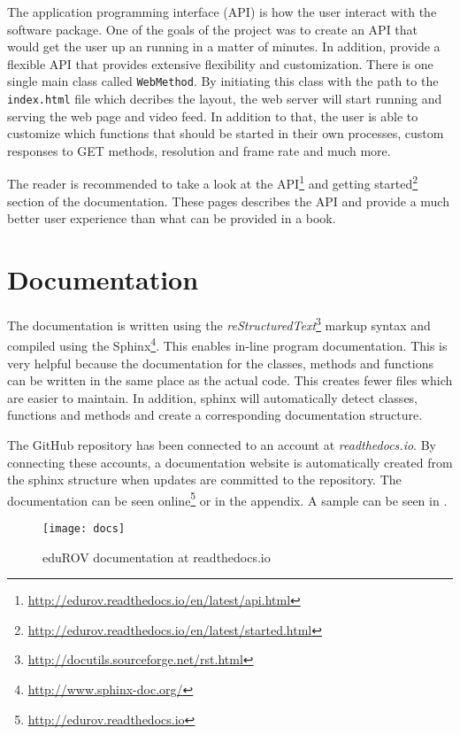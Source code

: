 The application programming interface (API) is how the user interact with the software package. One of the goals of the project was to create an API that would get the user up an running in a matter of minutes. In addition, provide a flexible API that provides extensive flexibility and customization. There is one single main class called \texttt{WebMethod}. By initiating this class with the path to the \texttt{index.html} file which decribes the layout, the web server will start running and serving the web page and video feed. In addition to that, the user is able to customize which functions that should be started in their own processes, custom responses to GET methods, resolution and frame rate and much more.

The reader is recommended to take a look at the API\footnote{\url{http://edurov.readthedocs.io/en/latest/api.html}} and getting started\footnote{\url{http://edurov.readthedocs.io/en/latest/started.html}} section of the documentation. These pages describes the API and provide a much better user experience than what can be provided in a book. 


\section{Documentation}


The documentation is written using the \emph{reStructuredText}\footnote{\url{http://docutils.sourceforge.net/rst.html}} markup syntax and compiled using the Sphinx\footnote{\url{http://www.sphinx-doc.org/}}. This enables in-line program documentation. This is very helpful because the documentation for the classes, methods and functions can be written in the same place as the actual code. This creates fewer files which are easier to maintain. In addition, sphinx will automatically detect classes, functions and methods and create a corresponding documentation structure.

The GitHub repository has been connected to an account at \emph{readthedocs.io}. By connecting these accounts, a documentation website is automatically created from the sphinx structure when updates are committed to the repository. The documentation can be seen online\footnote{\url{http://edurov.readthedocs.io}} or in the appendix. A sample can be seen in .

\begin{figure}[h!]
    \centering
    \texttt{[image: docs]}
    \caption{eduROV documentation at readthedocs.io}
    \label{docs}
\end{figure}
\clearpage
